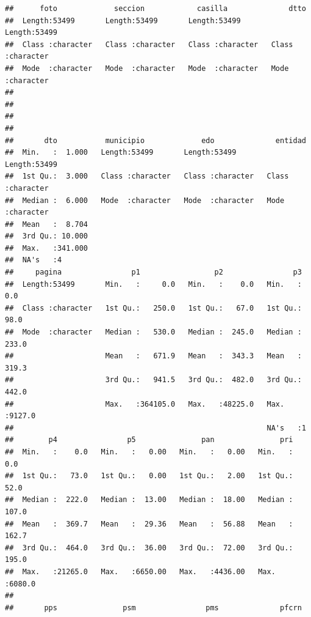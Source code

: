 \documentclass[
]{article}
\begin{document}
\begin{verbatim}
##      foto             seccion            casilla              dtto          
##  Length:53499       Length:53499       Length:53499       Length:53499      
##  Class :character   Class :character   Class :character   Class :character  
##  Mode  :character   Mode  :character   Mode  :character   Mode  :character  
##                                                                             
##                                                                             
##                                                                             
##                                                                             
##       dto           municipio             edo              entidad         
##  Min.   :  1.000   Length:53499       Length:53499       Length:53499      
##  1st Qu.:  3.000   Class :character   Class :character   Class :character  
##  Median :  6.000   Mode  :character   Mode  :character   Mode  :character  
##  Mean   :  8.704                                                           
##  3rd Qu.: 10.000                                                           
##  Max.   :341.000                                                           
##  NA's   :4                                                                 
##     pagina                p1                 p2                p3        
##  Length:53499       Min.   :     0.0   Min.   :    0.0   Min.   :   0.0  
##  Class :character   1st Qu.:   250.0   1st Qu.:   67.0   1st Qu.:  98.0  
##  Mode  :character   Median :   530.0   Median :  245.0   Median : 233.0  
##                     Mean   :   671.9   Mean   :  343.3   Mean   : 319.3  
##                     3rd Qu.:   941.5   3rd Qu.:  482.0   3rd Qu.: 442.0  
##                     Max.   :364105.0   Max.   :48225.0   Max.   :9127.0  
##                                                          NA's   :1       
##        p4                p5               pan               pri        
##  Min.   :    0.0   Min.   :   0.00   Min.   :   0.00   Min.   :   0.0  
##  1st Qu.:   73.0   1st Qu.:   0.00   1st Qu.:   2.00   1st Qu.:  52.0  
##  Median :  222.0   Median :  13.00   Median :  18.00   Median : 107.0  
##  Mean   :  369.7   Mean   :  29.36   Mean   :  56.88   Mean   : 162.7  
##  3rd Qu.:  464.0   3rd Qu.:  36.00   3rd Qu.:  72.00   3rd Qu.: 195.0  
##  Max.   :21265.0   Max.   :6650.00   Max.   :4436.00   Max.   :6080.0  
##                                                                        
##       pps               psm                pms              pfcrn        

\end{verbatim}
\end{document}
